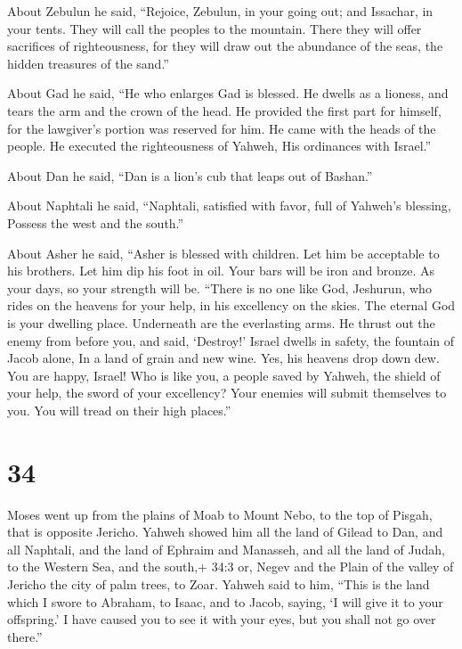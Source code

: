  About Zebulun he said, ``Rejoice, Zebulun, in your going
out; and Issachar, in your tents.  They will call the
peoples to the mountain. There they will offer sacrifices of
righteousness, for they will draw out the abundance of the seas, the
hidden treasures of the sand.''

 About Gad he said, ``He who enlarges Gad is blessed. He
dwells as a lioness, and tears the arm and the crown of the head.
 He provided the first part for himself, for the lawgiver's
portion was reserved for him. He came with the heads of the people. He
executed the righteousness of Yahweh, His ordinances with Israel.''

 About Dan he said, ``Dan is a lion's cub that leaps out of
Bashan.''

 About Naphtali he said, ``Naphtali, satisfied with favor,
full of Yahweh's blessing, Possess the west and the south.''

 About Asher he said, ``Asher is blessed with children. Let
him be acceptable to his brothers. Let him dip his foot in oil.
 Your bars will be iron and bronze. As your days, so your
strength will be.  ``There is no one like God, Jeshurun,
who rides on the heavens for your help, in his excellency on the skies.
 The eternal God is your dwelling place. Underneath are the
everlasting arms. He thrust out the enemy from before you, and said,
`Destroy!'  Israel dwells in safety, the fountain of Jacob
alone, In a land of grain and new wine. Yes, his heavens drop down dew.
 You are happy, Israel! Who is like you, a people saved by
Yahweh, the shield of your help, the sword of your excellency? Your
enemies will submit themselves to you. You will tread on their high
places.''

\hypertarget{section-33}{%
\section{34}\label{section-33}}

 Moses went up from the plains of Moab to Mount Nebo, to the
top of Pisgah, that is opposite Jericho. Yahweh showed him all the land
of Gilead to Dan,  and all Naphtali, and the land of Ephraim
and Manasseh, and all the land of Judah, to the Western Sea,
 and the south,+ 34:3 or, Negev and the Plain of the valley
of Jericho the city of palm trees, to Zoar.  Yahweh said to
him, ``This is the land which I swore to Abraham, to Isaac, and to
Jacob, saying, `I will give it to your offspring.' I have caused you to
see it with your eyes, but you shall not go over there.''

